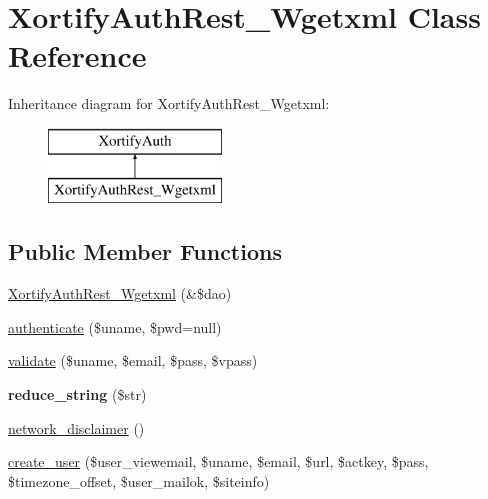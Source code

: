 \hypertarget{class_xortify_auth_rest___wgetxml}{\section{Xortify\-Auth\-Rest\-\_\-\-Wgetxml Class Reference}
\label{class_xortify_auth_rest___wgetxml}
}
Inheritance diagram for Xortify\-Auth\-Rest\-\_\-\-Wgetxml\-:\begin{figure}[H]
\begin{center}
\leavevmode
\includegraphics[height=2.000000cm]{class_xortify_auth_rest___wgetxml}
\end{center}
\end{figure}
\subsection*{Public Member Functions}
\begin{DoxyCompactItemize}
\item 
\hyperlink{class_xortify_auth_rest___wgetxml_ad9ae0e673fddaa94155c8d1b39e6c7cd}{Xortify\-Auth\-Rest\-\_\-\-Wgetxml} (\&\$dao)
\item 
\hyperlink{class_xortify_auth_rest___wgetxml_a912be082cf17cadade102b65d1aa14de}{authenticate} (\$uname, \$pwd=null)
\item 
\hyperlink{class_xortify_auth_rest___wgetxml_a60785d8d2072bc3edbeedb847a35cb58}{validate} (\$uname, \$email, \$pass, \$vpass)
\item 
\hypertarget{class_xortify_auth_rest___wgetxml_aa2a8c6399a359afc739d23f4ba207fb7}{{\bfseries reduce\-\_\-string} (\$str)}\label{class_xortify_auth_rest___wgetxml_aa2a8c6399a359afc739d23f4ba207fb7}

\item 
\hyperlink{class_xortify_auth_rest___wgetxml_ab937974fee7f6dd4592b4405a6f53293}{network\-\_\-disclaimer} ()
\item 
\hyperlink{class_xortify_auth_rest___wgetxml_a2673a758403bc116818a4672d254e721}{create\-\_\-user} (\$user\-\_\-viewemail, \$uname, \$email, \$url, \$actkey, \$pass, \$timezone\-\_\-offset, \$user\-\_\-mailok, \$siteinfo)
\end{DoxyCompactItemize}

